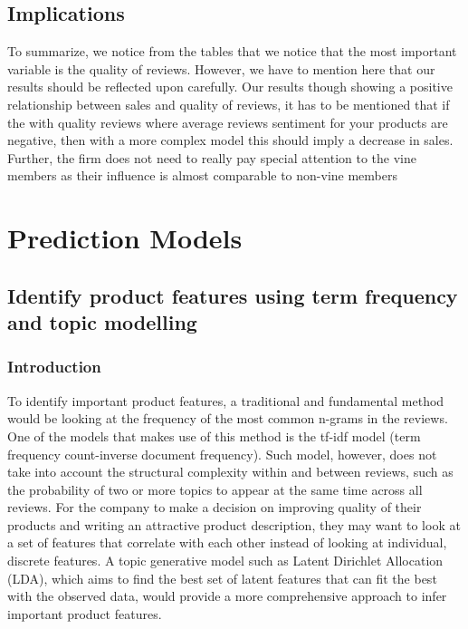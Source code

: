 \documentclass[reqno]{article}
\theoremstyle{definition}
\theoremstyle{definition}
\theoremstyle{remark}
\begin{document}
\subsection{Implications}
To summarize, we notice from the tables that we notice that the most important variable is the quality of reviews. However, we have to mention here that our results should be reflected upon carefully. Our results though showing a positive relationship between sales and quality of reviews, it has to be mentioned that if the with quality reviews where average reviews sentiment for your products are negative, then with a more complex model this should imply a decrease in sales. Further, the firm does not need to really pay special attention to the vine members as their influence is almost comparable to non-vine members
\section{Prediction Models}
\subsection{Identify product features using term frequency and  topic modelling}
\subsubsection{Introduction}
To identify important product features, a traditional and fundamental method would be looking at the frequency of the most common n-grams in the reviews. One of the models that makes use of this method is the tf-idf model (term frequency count-inverse document frequency). Such model, however, does not take into account the structural complexity within and between reviews, such as the probability of two or more topics to appear at the same time across all reviews. For the company to make a decision on improving quality of their products and writing an attractive product description, they may want to look at a set of features that correlate with each other instead of looking at individual, discrete features. A topic generative model such as Latent Dirichlet Allocation (LDA), which aims to find the best set of latent features that can fit the best with the observed data, would provide a more comprehensive approach to infer important product features.  \cite{Blei_Ng_Jordan}
\end{document}
